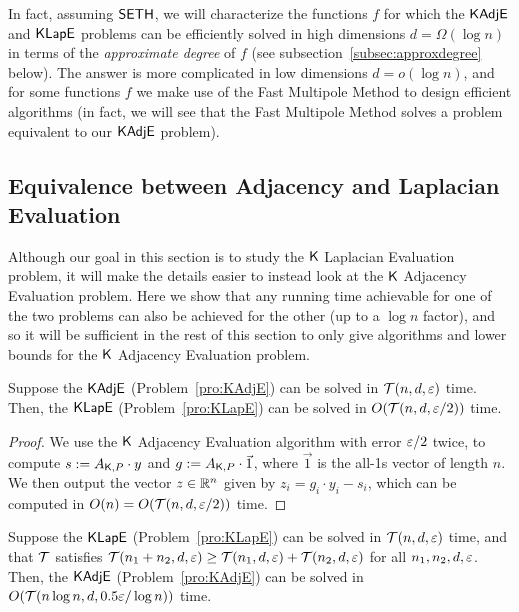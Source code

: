 In fact, assuming $\mathsf{SETH}$, we will characterize the functions $f$ for which the $\mathsf{KAdjE}$ and $\mathsf{KLapE}$ problems can be efficiently solved in high dimensions $d = \Omega(\log n)$ in terms of the \emph{approximate degree} of $f$ (see subsection~\ref{subsec:approxdegree} below). The answer is more complicated in low dimensions $d = o(\log n)$, and for some functions $f$ we make use of the Fast Multipole Method to design efficient algorithms (in fact, we will see that the Fast Multipole Method solves a problem equivalent to our $\mathsf{KAdjE}$ problem). 


\subsection{Equivalence between Adjacency and Laplacian Evaluation}

Although our goal in this section is to study the $\mathsf{K}$ Laplacian Evaluation problem, it will make the details easier to instead look at the $\mathsf{K}$ Adjacency Evaluation problem. Here we show that any running time achievable for one of the two problems can also be achieved for the other (up to a $\log n$ factor), and so it will be sufficient in the rest of this section to only give algorithms and lower bounds for the $\mathsf{K}$ Adjacency Evaluation problem.

\begin{proposition} \label{prop:adjtolap}
Suppose the $\mathsf{KAdjE}$ (Problem~\ref{pro:KAdjE}) can be solved in $\mathcal{T}(n,d,\varepsilon)$ time. Then, the $\mathsf{KLapE}$ (Problem~\ref{pro:KLapE}) can be solved in $O(\mathcal{T}(n,d,\varepsilon/2))$ time.
\end{proposition}

\begin{proof}
We use the $\mathsf{K}$ Adjacency Evaluation algorithm with error $\varepsilon/2$ twice, to compute $s := A_{\mathsf{K}, P} \cdot y$ and $g := A_{\mathsf{K},P} \cdot \vec{1}$, where $\vec{1}$ is the all-1s vector of length $n$. We then output the vector $z \in {\mathbb R}^n$ given by $z_i = g_i \cdot y_i - s_i$, which can be computed in $O(n) = O(\mathcal{T}(n,d,\varepsilon/2))$ time.
\end{proof}


\begin{proposition} \label{prop:laptoadj}
Suppose the $\mathsf{KLapE}$ (Problem~\ref{pro:KLapE}) can be solved in $\mathcal{T}(n,d,\varepsilon)$ time, and that $\mathcal{T}$ satisfies $\mathcal{T}(n_1 + n_2,d,\varepsilon) \geq \mathcal{T}(n_1,d,\varepsilon)+\mathcal{T}(n_2,d,\varepsilon)$ for all $n_1, n_2, d, \varepsilon$. Then, the $\mathsf{KAdjE}$ (Problem~\ref{pro:KAdjE}) can be solved in $ O( \mathcal{T}(n \log n,d,0.5 \varepsilon/\log n))$ time.
\end{proposition}

